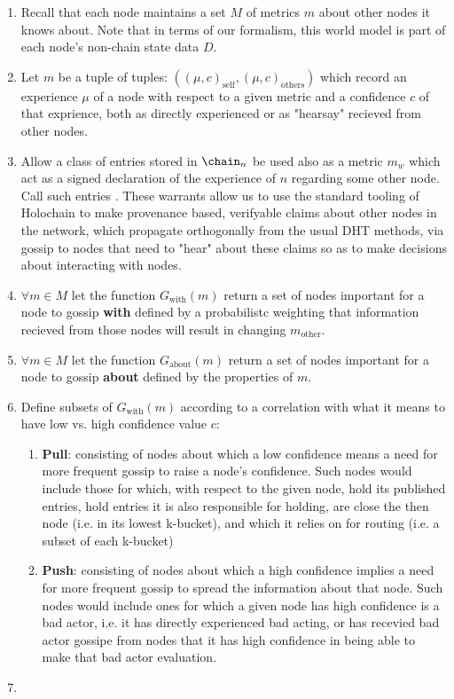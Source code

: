 \documentclass[twocolumn,showpacs,%
  nofootinbib,aps,superscriptaddress,%
  eqsecnum,prd,notitlepage,showkeys,10pt]{revtex4-1}
\begin{document}
\begin{enumerate}
\item Recall that each node maintains a set $M$ of metrics $m$ about other nodes it knows about. Note that in terms of our formalism, this world model is part of each node's non-chain state data $D$.
\item Let $m$ be a tuple of tuples: $((\mu,c)_\text{self},(\mu,c)_\text{others})$ which record an experience $\mu$ of a node with respect to a given metric and a confidence $c$ of that exprience, both as directly experienced or as "hearsay" recieved from other nodes.
\item Allow a class of entries stored in $\chain_n$ be used also as a metric $m_w$ which act as a signed declaration of the experience of $n$ regarding some other node.  Call such entries .  These warrants allow us to use the standard tooling of Holochain to make provenance based, verifyable claims about other nodes in the network, which propagate orthogonally from the usual DHT methods, via gossip to nodes that need to "hear" about these claims so as to make decisions about interacting with nodes.
\item $\forall m \in M$ let the function $G_\text{with}(m)$ return a set of nodes important for a node to gossip \textbf{with} defined by a probabilistc weighting that information recieved from those nodes will result in changing $m_\text{other}$.
\item $\forall m \in M$ let the function $G_\text{about}(m)$ return a set of nodes important for a node to gossip \textbf{about} defined by the properties of $m$.
\item Define subsets of $G_\text{with}(m)$ according to a correlation with what it means to have low vs. high confidence value $c$:
\begin{enumerate}
\item \textbf{Pull}: consisting of nodes about which a low confidence means a need for more frequent gossip to raise a node's confidence.  Such nodes would include those for which, with respect to the given node, hold its published entries, hold entries it is also responsible for holding, are close the then node (i.e. in its lowest k-bucket), and which it relies on for routing (i.e. a subset of each k-bucket)
\item \textbf{Push}: consisting of nodes about which a high confidence implies a need for more frequent gossip to spread the information about that node.  Such nodes would include ones for which a given node has high confidence is a bad actor, i.e. it has directly experienced bad acting, or has recevied bad actor gossipe from nodes that it has high confidence in being able to make that bad actor evaluation.
\end{enumerate}
\item {}
\end{enumerate}
\end{document}
